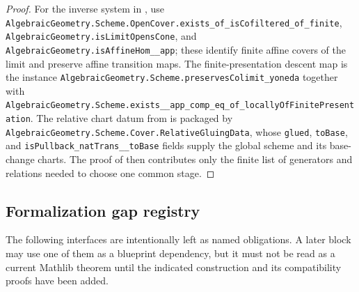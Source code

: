 \begin{proof}
  For the inverse system in
  , use
  \texttt{AlgebraicGeometry.Scheme.OpenCover.exists\_of\_isCofiltered\_of\_finite},
  \texttt{AlgebraicGeometry.isLimitOpensCone}, and
  \texttt{AlgebraicGeometry.isAffineHom\_\pi\_app}; these identify finite
  affine covers of the limit and preserve affine transition maps.  The
  finite-presentation descent map is the instance
  \texttt{AlgebraicGeometry.Scheme.preservesColimit\_yoneda} together with
  \texttt{AlgebraicGeometry.Scheme.exists\_\pi\_app\_comp\_eq\_of\_locallyOfFinitePresentation}.
  The relative chart datum from
   is packaged by
  \texttt{AlgebraicGeometry.Scheme.Cover.RelativeGluingData}, whose
  \texttt{glued}, \texttt{toBase}, and
  \texttt{isPullback\_natTrans\_\iota\_toBase} fields supply the global
  scheme and its base-change charts.  The proof of
   then contributes only the
  finite list of generators and relations needed to choose one common stage.
\end{proof}

\subsection{Formalization gap registry}
\label{sec:nagata-gap-registry}

The following interfaces are intentionally left as named obligations.  A
later block may use one of them as a blueprint dependency, but it must not be
read as a current Mathlib theorem until the indicated construction and its
compatibility proofs have been added.

